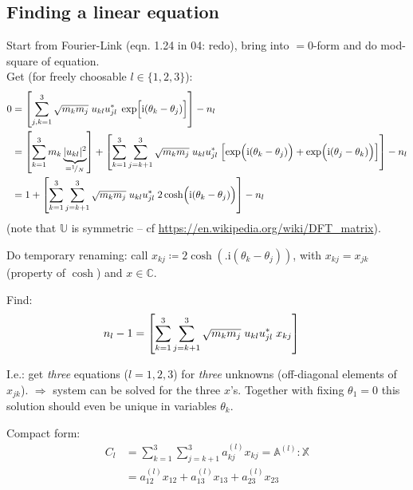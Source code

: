 \documentclass[
	english,
	a4paper,
	fontsize=10pt,
	parskip=half,
	titlepage=true,
	DIV=12,
	final
]{scrreprt}
\newcommand*{\Thus}{\ensuremath{\Rightarrow}\xspace}
\newcommand*{\smallfrac}  [2]{\ensuremath{{}^        {#1} \!/_        {#2}}}
\newcommand*{\iunit}{\ensuremath{\mathrm{i}}}
\newcommand*{\setComplex}  {\ensuremath{\mathds{C}}}
\begin{document}
\subsection{Finding a linear equation}
Start from Fourier-Link (eqn. 1.24 in 04: redo), bring into $= 0$-form and do mod-square of equation.\\
Get (for freely choosable $l \in \{1,2,3\}$):
\begin{align}
	0
&=
	\qty[
		\sum_{j,k=1}^3
			\sqrt{m_k m_j}  \;
			u_{kl} u_{jl}^* \;
			\exp[\Big. \iunit(\theta_k - \theta_j)]
	] - n_l
	\label{eqn:FourierModSquare} \\
&=
	\qty[
		\sum_{k=1}^3
			m_k
			\underbrace{|u_{kl}|^2}_{= \smallfrac{1}{N}}
	] +
	\qty[
		\sum_{k=1}^3
		\sum_{j=k+1}^3
			\sqrt{m_k m_j}  \;
			u_{kl} u_{jl}^* \;
			\qty[
				\exp(\Big. \iunit(\theta_k - \theta_j)) +
				\exp(\Big. \iunit(\theta_j - \theta_k))
			]
	]	- n_l \\
&=
	1 + 
	\qty[
		\sum_{k=1}^3
		\sum_{j=k+1}^3
			\sqrt{m_k m_j}  \;
			u_{kl} u_{jl}^* \;
			2 \cosh(\Big. \iunit(\theta_k - \theta_j))
	]	- n_l
\end{align}
(note that $\mathbb{U}$ is symmetric -- cf \url{https://en.wikipedia.org/wiki/DFT_matrix}).

Do temporary renaming: call $x_{kj} \coloneqq 2 \cosh(\Big. \iunit(\theta_k - \theta_j))$, with $x_{kj} = x_{jk}$ (property of $\cosh$) and $x \in \setComplex$.

Find:
\begin{align}
	n_l - 1
&=
	\qty[
		\sum_{k=1}^3
		\sum_{j=k+1}^3
			\sqrt{m_k m_j}  \;
			u_{kl} u_{jl}^* \;
			x_{kj}
	]
\end{align}

I.\;e.: get \emph{three} equations ($l=1,2,3$) for \emph{three} unknowns (off-diagonal elements of $x_{jk}$). \Thus system can be solved for the three $x$'s. Together with fixing $\theta_1 = 0$ this solution should even be unique in variables $\theta_k$.

Compact form:
\begin{align}
	C_l
&=
	\sum_{k=1}^3
	\sum_{j=k+1}^3
		a^{(l)}_{kj} x_{kj}
=
	\mathbb{A}^{(l)} : \mathbb{X} \\
&=
	a^{(l)}_{12} x_{12} +
	a^{(l)}_{13} x_{13} +
	a^{(l)}_{23} x_{23}
	\label{eqn:matEqnPrecursor}
\end{align}
\end{document}
